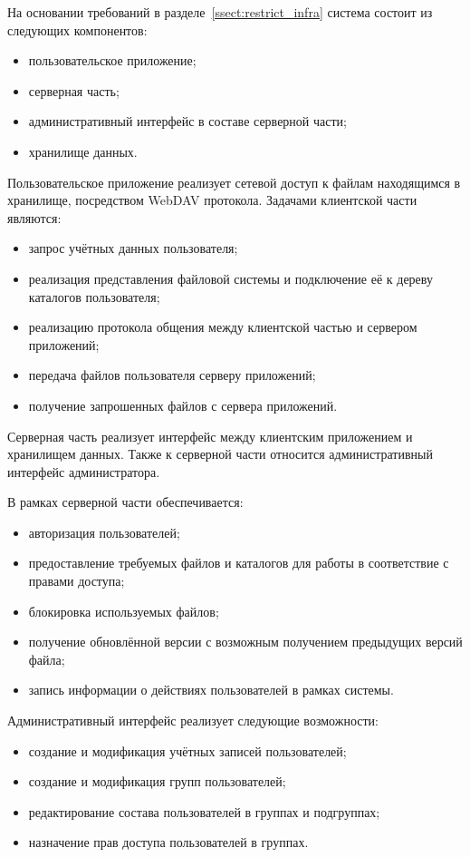 \documentclass[utf8,usehyperref,12pt]{G7-32}
\begin{document}
На основании требований в разделе~\ref{ssect:restrict_infra} система состоит из следующих компонентов:
\begin{itemize}
\item пользовательское приложение;
\item серверная часть;
\item административный интерфейс в составе серверной части;
\item хранилище данных.
\end{itemize}

Пользовательское приложение реализует сетевой доступ к файлам находящимся в хранилище, посредством WebDAV протокола. Задачами клиентской части являются:
\begin{itemize}
\item запрос учётных данных пользователя;
\item реализация представления файловой системы и подключение её к дереву каталогов пользователя;
\item реализацию протокола общения между клиентской частью и сервером приложений;
\item передача файлов пользователя серверу приложений;
\item получение запрошенных файлов с сервера приложений.
\end{itemize}

Серверная часть реализует интерфейс между клиентским приложением и хранилищем данных. Также к серверной части относится административный интерфейс администратора.

В рамках серверной части обеспечивается:
\begin{itemize}
\item авторизация пользователей;
\item предоставление требуемых файлов и каталогов для работы в соответствие с правами доступа; 
\item блокировка используемых файлов;
\item получение обновлённой версии с возможным получением предыдущих версий файла;
\item запись информации о действиях пользователей в рамках системы.
 \end{itemize}
 
Административный интерфейс реализует следующие возможности:

\begin{itemize}
	\item создание и модификация учётных записей пользователей;
	\item создание и модификация групп пользователей;
	\item редактирование состава пользователей в группах и подгруппах;
	\item назначение прав доступа пользователей в группах.
\end{itemize}
\end{document}
